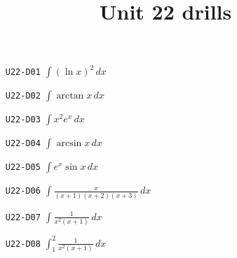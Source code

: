 \title{Unit 22 drills}\maketitle\begin{enumerate}
  \item[\texttt{U22-D01}] $\displaystyle \int(\ln x)^{2}\,dx$
  \item[\texttt{U22-D02}] $\displaystyle \int\arctan x\,dx$
  \item[\texttt{U22-D03}] $\displaystyle \int x^{2}e^{x}\,dx$
  \item[\texttt{U22-D04}] $\displaystyle \int\arcsin x\,dx$
  \item[\texttt{U22-D05}] $\displaystyle \int e^{x}\sin x\,dx$
  \item[\texttt{U22-D06}] $\displaystyle \int\frac{x}{(x+1)(x+2)(x+3)}\,dx$
  \item[\texttt{U22-D07}] $\displaystyle \int\frac{1}{x^{2}(x+1)}\,dx$
  \item[\texttt{U22-D08}] $\displaystyle \int_{1}^{2}\frac{1}{x^{2}(x+1)}\,dx$
\end{enumerate}
